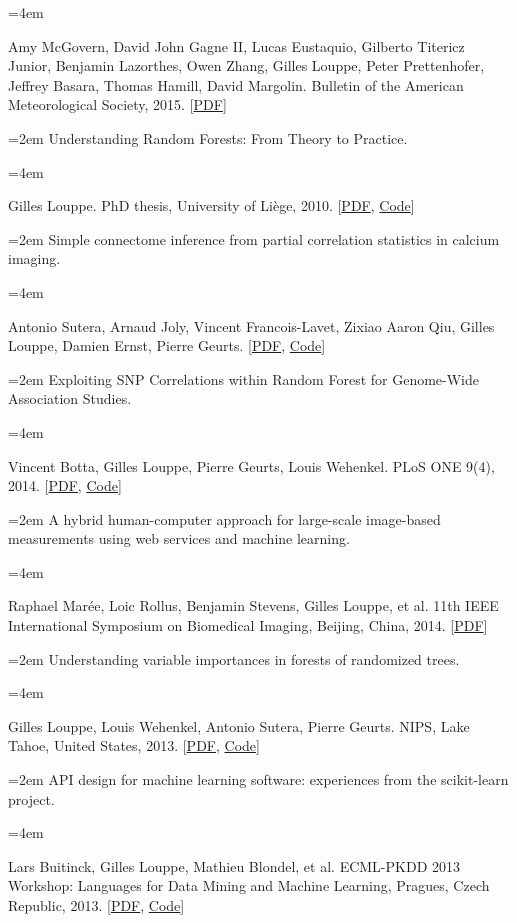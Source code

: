 \documentclass{scrartcl}
\newcommand{\MarginText}[1]{\marginpar{\raggedleft\itshape\small#1}}
\newcommand{\NewEntry}[2]{\noindent\hangindent=2em\hangafter=0 \MarginText{\footnotesize #1}#2\vspace{0.5em}}
\newcommand{\Description}[1]{\hangindent=4em\hangafter=0\noindent\raggedright\footnotesize{#1}\par\normalsize\vspace{1em}}
\begin{document}
\begin{cv}{}
\Description{Amy McGovern, David John Gagne II, Lucas Eustaquio, Gilberto Titericz Junior, Benjamin Lazorthes, Owen Zhang, Gilles Louppe, Peter Prettenhofer, Jeffrey Basara, Thomas Hamill, David Margolin.
Bulletin of the American Meteorological Society, 2015.
[\href{http://hdl.handle.net/2268/177115}{PDF}]}

\NewEntry{2014}{Understanding Random Forests: From Theory to Practice.}

\Description{Gilles Louppe.
PhD thesis, University of Li{\`e}ge, 2010.
[\href{http://hdl.handle.net/2268/170309}{PDF}, \href{https://github.com/glouppe/phd-thesis}{Code}]}

\NewEntry{}{Simple connectome inference from partial correlation statistics in calcium imaging.}

\Description{Antonio Sutera, Arnaud Joly, Vincent Francois-Lavet, Zixiao Aaron Qiu, Gilles Louppe, Damien Ernst, Pierre Geurts.
[\href{http://hdl.handle.net/2268/169767}{PDF}, \href{https://github.com/glouppe/kaggle-connectomics}{Code}]}

\NewEntry{}{Exploiting SNP Correlations within Random Forest for Genome-Wide Association Studies.}

\Description{Vincent Botta, Gilles Louppe, Pierre Geurts, Louis Wehenkel.
PLoS ONE 9(4), 2014.
[\href{http://dx.plos.org/10.1371/journal.pone.0093379}{PDF}, \href{https://github.com/0asa/TTree-source}{Code}]}

\NewEntry{}{A hybrid human-computer approach for large-scale image-based measurements using web services and machine learning.}

\Description{Raphael Mar{\'e}e, Loic Rollus, Benjamin Stevens, Gilles Louppe, et al.
11th IEEE International Symposium on Biomedical Imaging, Beijing, China, 2014.
[\href{http://hdl.handle.net/2268/162084}{PDF}]}

\NewEntry{2013}{Understanding variable importances in forests of randomized trees.}

\Description{Gilles Louppe, Louis Wehenkel, Antonio Sutera, Pierre Geurts.
NIPS, Lake Tahoe, United States, 2013.
[\href{http://hdl.handle.net/2268/155642}{PDF}, \href{http://github.com/glouppe/paper-variable-importances}{Code}]}

\NewEntry{}{API design for machine learning software: experiences from the scikit-learn project.}

\Description{Lars Buitinck, Gilles Louppe, Mathieu Blondel, et al.
ECML-PKDD 2013 Workshop: Languages for Data Mining and Machine Learning, Pragues, Czech Republic, 2013.
[\href{http://hdl.handle.net/2268/154357}{PDF}, \href{http://github.com/scikit-learn/scikit-learn}{Code}]}


\end{cv}
\end{document}
